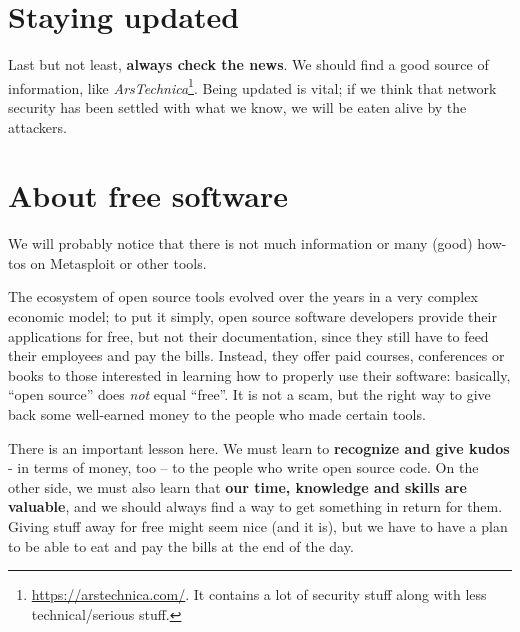 \section{Staying updated}
Last but not least, \textbf{always check the news}. We should find a good source of information, like \textit{ArsTechnica}\footnote{\url{https://arstechnica.com/}. It contains a lot of security stuff along with less technical/serious stuff.}. Being updated is vital; if we think that network security has been settled with what we know, we will be eaten alive by the attackers.

\section{About free software}
We will probably notice that there is not much information or many (good) how-tos on Metasploit or other tools.

The ecosystem of open source tools evolved over the years in a very complex economic model; to put it simply, open source software developers provide their applications for free, but not their documentation, since they still have to feed their employees and pay the bills. Instead, they offer paid courses, conferences or books to those interested in learning how to properly use their software: basically, “open source” does \textit{not} equal “free”. It is not a scam, but the right way to give back some well-earned money to the people who made certain tools.

There is an important lesson here. We must learn to \textbf{recognize and give kudos} - in terms of money, too – to the people who write open source code. On the other side, we must also learn that \textbf{our time, knowledge and skills are valuable}, and we should always find a way to get something in return for them. Giving stuff away for free might seem nice (and it is), but we have to have a plan to be able to eat and pay the bills at the end of the day.

